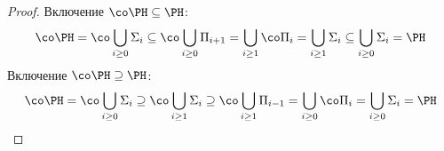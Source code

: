 	\begin{proof}
		Включение $\co\PH \subseteq \PH$:
		\begin{gather*}
			\co\PH =
				\co\bigcup_{i \ge 0} \Sigma_i \subseteq
				\co\bigcup_{i \ge 0} \Pi_{i+1} =
				\bigcup_{i \ge 1} \co\Pi_i =
				\bigcup_{i \ge 1} \Sigma_i \subseteq
				\bigcup_{i \ge 0} \Sigma_i =
				\PH
		\end{gather*}
		Включение $\co\PH \supseteq \PH$:
		\begin{gather*}
			\co\PH =
				\co\bigcup_{i \ge 0} \Sigma_i \supseteq
				\co\bigcup_{i \ge 1} \Sigma_i \supseteq
				\co\bigcup_{i \ge 1} \Pi_{i-1} =
				\bigcup_{i \ge 0} \co\Pi_i =
				\bigcup_{i \ge 0} \Sigma_i =
				\PH
		\end{gather*}
	\end{proof}

